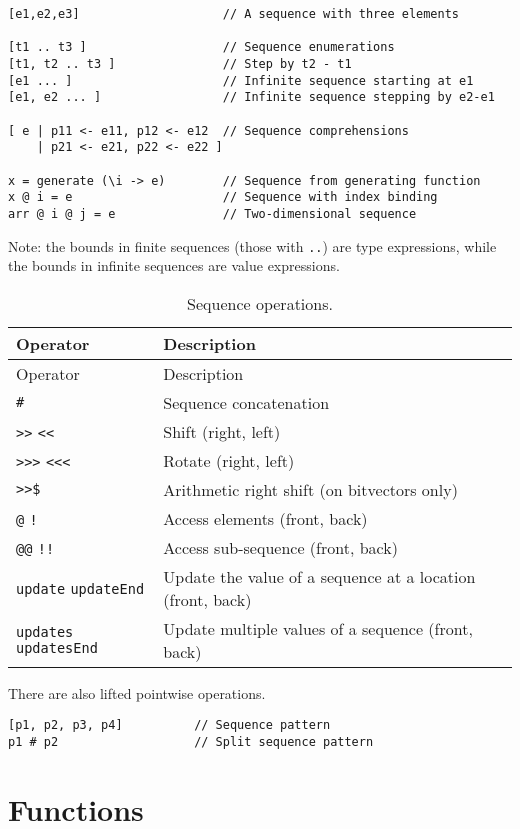 \begin{verbatim}
[e1,e2,e3]                    // A sequence with three elements

[t1 .. t3 ]                   // Sequence enumerations
[t1, t2 .. t3 ]               // Step by t2 - t1
[e1 ... ]                     // Infinite sequence starting at e1
[e1, e2 ... ]                 // Infinite sequence stepping by e2-e1

[ e | p11 <- e11, p12 <- e12  // Sequence comprehensions
    | p21 <- e21, p22 <- e22 ]

x = generate (\i -> e)        // Sequence from generating function
x @ i = e                     // Sequence with index binding
arr @ i @ j = e               // Two-dimensional sequence
\end{verbatim}

Note: the bounds in finite sequences (those with \texttt{..}) are type
expressions, while the bounds in infinite sequences are value
expressions.

\begin{longtable}[]{@{}ll@{}}
\caption{Sequence operations.}\tabularnewline
\toprule
Operator & Description\tabularnewline
\midrule
\endfirsthead
\toprule
Operator & Description\tabularnewline
\midrule
\endhead
\texttt{\#} & Sequence concatenation\tabularnewline
\texttt{\textgreater{}\textgreater{}} \texttt{\textless{}\textless{}} &
Shift (right, left)\tabularnewline
\texttt{\textgreater{}\textgreater{}\textgreater{}}
\texttt{\textless{}\textless{}\textless{}} & Rotate (right,
left)\tabularnewline
\texttt{\textgreater{}\textgreater{}\$} & Arithmetic right shift (on
bitvectors only)\tabularnewline
\texttt{@} \texttt{!} & Access elements (front, back)\tabularnewline
\texttt{@@} \texttt{!!} & Access sub-sequence (front,
back)\tabularnewline
\texttt{update} \texttt{updateEnd} & Update the value of a sequence at a
location (front, back)\tabularnewline
\texttt{updates} \texttt{updatesEnd} & Update multiple values of a
sequence (front, back)\tabularnewline
\bottomrule
\end{longtable}

There are also lifted pointwise operations.

\begin{verbatim}
[p1, p2, p3, p4]          // Sequence pattern
p1 # p2                   // Split sequence pattern
\end{verbatim}

\section{Functions}\label{functions}

